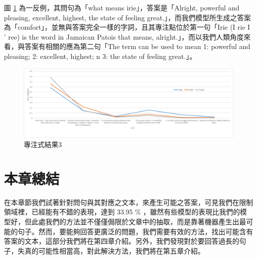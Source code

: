 圖 \ref{fig:attn_3} 為一反例，其問句為「what means irie」，答案是「Alright, powerful and pleasing, excellent, highest, the state of feeling great.」，而我們模型所生成之答案為「comfort」，並無與答案完全一樣的字詞，且其專注點位於第一句「Irie (I rie I '  ree) is the word in Jamaican Patois that means, alright.」，而以我們人類角度來看，與答案有相關的應為第二句「The term can be used to mean 1: powerful and pleasing; 2: excellent, highest; n 3: the state of feeling great.」。
\begin{figure}
    \centering
    \includegraphics[scale=0.6,angle=90]{images/chap3_attn3.png}
    \caption{專注式結果3}\label{fig:attn_3}
\end{figure}
\begin{figure}
\end{figure}
\section{本章總結}
在本章節我們試著針對問句與其對應之文本，來產生可能之答案，可見我們在限制領域裡，已經能有不錯的表現，達到 33.95 \% ，雖然有些模型的表現比我們的模型好，但此處我們的方法並不僅僅侷限於文章中的抽取，而是靠著機器產生出最可能的句子。然而，要能夠回答更廣泛的問題，我們需要有效的方法，找出可能含有答案的文本，這部分我們將在第四章介紹。另外，我們發現對於要回答過長的句子，失真的可能性相當高，對此解決方法，我們將在第五章介紹。
